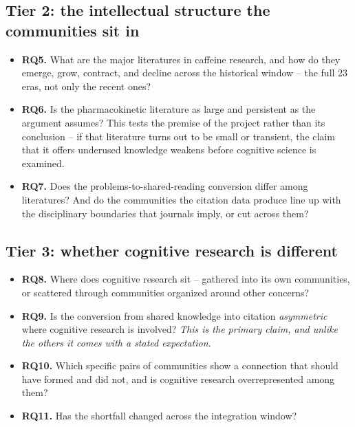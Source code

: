 \documentclass[11pt]{article}
\begin{document}
\subsection{Tier 2: the intellectual structure the communities sit in}

\begin{itemize}[leftmargin=2em]
  \item \textbf{RQ5.} What are the major literatures in caffeine research, and how do
        they emerge, grow, contract, and decline across the historical window -- the full
        23 eras, not only the recent ones?
  \item \textbf{RQ6.} Is the pharmacokinetic literature as large and persistent as the
        argument assumes? This tests the premise of the project rather than its
        conclusion -- if that literature turns out to be small or transient, the claim
        that it offers underused knowledge weakens before cognitive science is examined.
  \item \textbf{RQ7.} Does the problems-to-shared-reading conversion differ among
        literatures? And do the communities the citation data produce line up with the
        disciplinary boundaries that journals imply, or cut across them?
\end{itemize}

\subsection{Tier 3: whether cognitive research is different}

\begin{itemize}[leftmargin=2em]
  \item \textbf{RQ8.} Where does cognitive research sit -- gathered into its own
        communities, or scattered through communities organized around other concerns?
  \item \textbf{RQ9.} Is the conversion from shared knowledge into citation
        \emph{asymmetric} where cognitive research is involved? \emph{This is the primary
        claim, and unlike the others it comes with a stated expectation.}
  \item \textbf{RQ10.} Which specific pairs of communities show a connection that should
        have formed and did not, and is cognitive research overrepresented among them?
  \item \textbf{RQ11.} Has the shortfall changed across the integration window?
\end{itemize}
\end{document}
